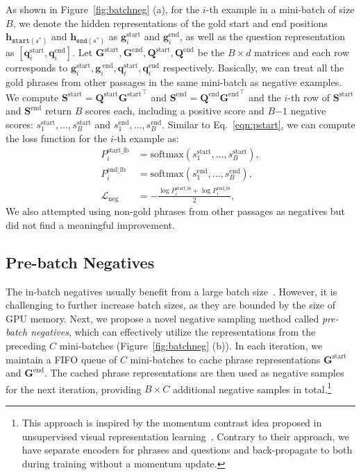 \documentclass[11pt,a4paper]{article}
\newcommand\ti[1]{\textit{#1}}
\newcommand\ttt[1]{\texttt{#1}}
\newcommand\mf[1]{\mathbf{#1}}
\begin{document}
As shown in Figure~\ref{fig:batchneg} (a), for the $i$-th example in a mini-batch of size $B$, we denote the hidden representations of the gold start and end positions $\mf{h}_{\ttt{start}(s^*)}$ and $\mf{
h}_{\ttt{end}(s^*)}$ as $\mf{g}^{\text{start}}_i$ and $\mf{g}^{\text{end}}_i$, as well as the question representation as $[\mf{q}^{\text{start}}_i, \mf{q}^{\text{end}}_i]$. Let $\mf{G}^{\text{start}}, \mf{G}^{\text{end}}, \mf{Q}^{\text{start}}, \mf{Q}^{\text{end}}$ be the $B \times d$ matrices and each row corresponds to $\mf{g}^{\text{start}}_i, \mf{g}^{\
\text{end}}_i, \mf{q}^{\text{start}}_i, \mf{q}^{\text{end}}_i$ respectively. Basically, we can treat all the gold phrases from other passages  in the same mini-batch as negative examples.  We compute $\mf{S}^{\text{start}} = {\mf{Q}^{\text{start}}}{\mf{G}^{\text{start}}}^{\intercal}$ and $\mf{S}^{\text{end}}
 = {\mf{Q}^{\text{end}}}{\mf{G}^{\text{end}}}^{\intercal}$ and the $i$-th row of $\mf{S}^{\text{start}}$ and $\mf{S}^{\text{end}}$ return $B$ scores each, including a positive score and $B$$-1$ negative scores: $s^{\text{start}}_1, \ldots, s^{\text{start}}_B$ and $s^{\text{end}}_1, \ldots, s^{\text{end}}_B$. Similar to Eq.~\eqref{eqn:pstart}, we can compute the loss function for the $i$-th example as:\vspace{-0.5em}
\begin{equation}\label{eqn:inbatch}
\begin{split}
    P^\text{start\_ib}_{i} &= \textrm{softmax}(s_1^\text{start}, \dots, s_B^\text{start}), \\
    P^\text{end\_ib}_{i} &= \textrm{softmax}(s_1^\text{end}, \dots, s_B^\text{end}), \\
    \mathcal{L}_\text{neg} &= -\frac{\log P^\text{start\_ib}_{i}+\log P^\text{end\_ib}_{i}}{2},
\end{split}
\end{equation}
We also attempted using non-gold phrases from other passages as negatives but did not find a meaningful improvement.

\subsection{Pre-batch Negatives}\label{sec:prebatch}
The in-batch negatives usually benefit from a large batch size~\citep{karpukhin2020dense}.
However, it is challenging to further increase batch sizes, as they are bounded by the size of GPU memory.
Next, we propose a novel negative sampling method called \ti{pre-batch negatives}, which can effectively utilize the representations from the preceding $C$ mini-batches (Figure~\ref{fig:batchneg} (b)).
In each iteration, we maintain a FIFO queue of $C$ mini-batches to cache phrase representations $\mf{G}^{\text{start}}$ and $\mf{G}^{\text{end}}$.  The cached phrase representations are then used as negative samples for the next iteration, providing $B \times C$ additional negative samples in total.\footnote{This approach is inspired by the momentum contrast idea proposed in unsupervised visual representation learning~\cite{he2020momentum}. Contrary to their approach, we have separate encoders for phrases and questions and back-propagate to both during training without a momentum update.}
\end{document}
